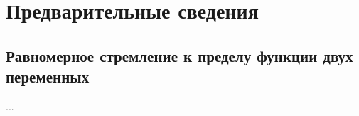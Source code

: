 \section{Предварительные сведения}
\subsection{Равномерное стремление к пределу функции двух переменных}
...
